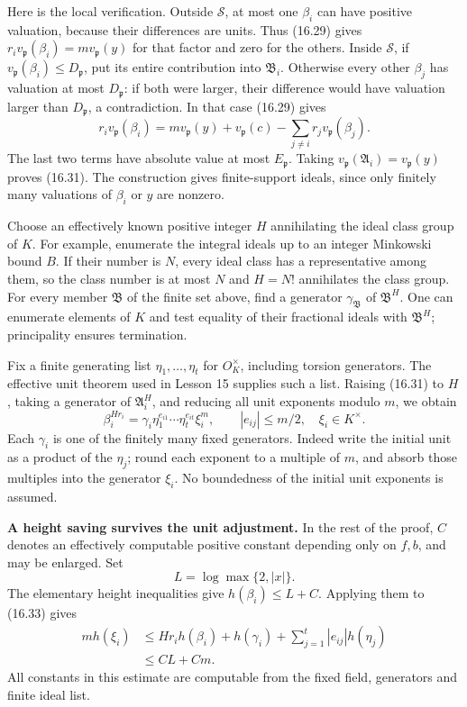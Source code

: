 \documentclass[
  11pt,
  a4paper,
]{article}
\begin{document}
Here is the local verification. Outside \(\mathcal S\), at most one
\(\beta_i\) can have positive valuation, because their differences are
units. Thus (16.29) gives
\(r_i v_{\mathfrak p}(\beta_i)=m v_{\mathfrak p}(y)\) for that factor
and zero for the others. Inside \(\mathcal S\), if
\(v_{\mathfrak p}(\beta_i)\leq
D_{\mathfrak p}\), put its entire contribution into \(\mathfrak B_i\).
Otherwise every other \(\beta_j\) has valuation at most
\(D_{\mathfrak p}\): if both were larger, their difference would have
valuation larger than \(D_{\mathfrak p}\), a contradiction. In that case
(16.29) gives \[
 r_i v_{\mathfrak p}(\beta_i)
 =m v_{\mathfrak p}(y)+
   v_{\mathfrak p}(c)-\sum_{j\ne i}r_jv_{\mathfrak p}(\beta_j).
 \tag{16.32}
\] The last two terms have absolute value at most \(E_{\mathfrak p}\).
Taking \(v_{\mathfrak p}(\mathfrak A_i)=v_{\mathfrak p}(y)\) proves
(16.31). The construction gives finite-support ideals, since only
finitely many valuations of \(\beta_i\) or \(y\) are nonzero.

Choose an effectively known positive integer \(H\) annihilating the
ideal class group of \(K\). For example, enumerate the integral ideals
up to an integer Minkowski bound \(B\). If their number is \(N\), every
ideal class has a representative among them, so the class number is at
most \(N\) and \(H=N!\) annihilates the class group. For every member
\(\mathfrak B\) of the finite set above, find a generator
\(\gamma_{\mathfrak B}\) of \(\mathfrak B^H\). One can enumerate
elements of \(K\) and test equality of their fractional ideals with
\(\mathfrak B^H\); principality ensures termination.

Fix a finite generating list \(\eta_1,\ldots,\eta_t\) for
\(O_K^\times\), including torsion generators. The effective unit theorem
used in Lesson 15 supplies such a list. Raising (16.31) to \(H\), taking
a generator of \(\mathfrak A_i^H\), and reducing all unit exponents
modulo \(m\), we obtain \[
 \beta_i^{Hr_i}
   =\gamma_i\eta_1^{e_{i1}}\cdots\eta_t^{e_{it}}\xi_i^m,
 \qquad |e_{ij}|\leq m/2,\quad \xi_i\in K^\times.
 \tag{16.33}
\] Each \(\gamma_i\) is one of the finitely many fixed generators.
Indeed write the initial unit as a product of the \(\eta_j\); round each
exponent to a multiple of \(m\), and absorb those multiples into the
generator \(\xi_i\). No boundedness of the initial unit exponents is
assumed.

\textbf{A height saving survives the unit adjustment.} In the rest of
the proof, \(C\) denotes an effectively computable positive constant
depending only on \(f,b\), and may be enlarged. Set \[
 L=\log\max\{2,|x|\}.
 \tag{16.34}
\] The elementary height inequalities give \(h(\beta_i)\leq L+C\).
Applying them to (16.33) gives \[
 \begin{aligned}
 m h(\xi_i)
 &\leq Hr_i h(\beta_i)+h(\gamma_i)
       +\sum_{j=1}^t|e_{ij}|h(\eta_j)\\
 &\leq CL+Cm.
 \end{aligned}
 \tag{16.35}
\] All constants in this estimate are computable from the fixed field,
generators and finite ideal list.
\end{document}

